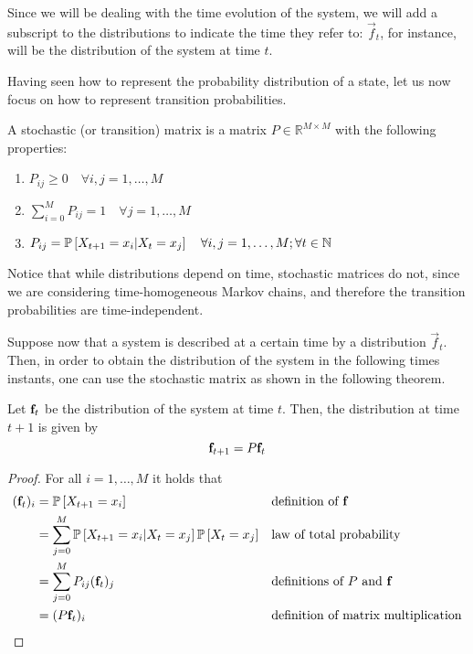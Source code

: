 Since we will be dealing with the time evolution of the system, we will add a subscript to the distributions to indicate the time they refer to: $\vec{f}_t$, for instance, will be the distribution of the system at time $t$.

Having seen how to represent the probability distribution of a state, let us now focus on how to represent transition probabilities.

\begin{ndef}  \label{def:stoc_matrix}
    A stochastic (or transition) matrix is a matrix $P \in \mathbb{R}^{M\times M}$ with the following properties:
    \begin{center}
        \begin{enumerate}
            \item $P_{ij} \geq 0 \quad \forall i,j = 1,\dots,M$
            \item $\sum_{i = 0}^M P_{ij} = 1 \quad \forall j = 1,\dots,M$
            \item $P_{ij} = \mathbb{P}\left[X_{t+1} = x_i | X_t = x_j \right] \quad \forall i,j = 1,\dots,M; \forall t\in \mathbb N$
        \end{enumerate}
    \end{center}
\end{ndef}

Notice that while distributions depend on time, stochastic matrices do not, since we are considering time-homogeneous Markov chains, and therefore the transition probabilities are time-independent.

\smallskip
Suppose now that a system is described at a certain time by a distribution $\vec{f}_t$. Then, in order to obtain the distribution of the system in the following times instants, one can use the stochastic matrix as shown in the following theorem.

\begin{theorem} \label{th:evolution_simple}
    Let $\mathbf{f}_t$ be the distribution of the system at time $t$. Then, the distribution at time $t + 1$ is given by
    \begin{equation}
        \mathbf{f}_{t+1} = P \mathbf{f}_t
    \end{equation}
\end{theorem}
\begin{proof}
    For all $i = 1,\dots,M$ it holds that
    \begin{align}
        (\mathbf{f}_t)_i
         & = \mathbb{P}\left[X_{t+1} = x_i \right]                                           &  & \text{definition of $\mathbf{f}$}                                     \\
         & = \sum_{j = 0}^M \mathbb{P}\left[X_{t+1} = x_i | X_t = x_j\right] \mathbb{P}\left[X_t = x_j\right] &  & \text{law of total probability}                \\
         & = \sum_{j = 0}^M P_{ij} (\mathbf{f}_t)_j                                   &  & \text{definitions of $P$ and $\mathbf{f}$} \label{eq:matmul1}          \\
         & = (P \mathbf{f}_t)_i                                                       &  & \text{definition of matrix multiplication} \label{eq:matmul2}
    \end{align}

\end{proof}

